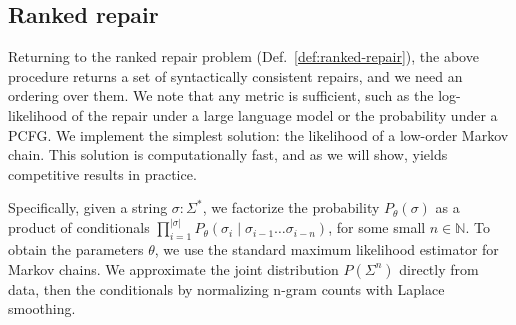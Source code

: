 \documentclass[sigplan,review,acmsmall,nonacm,anonymous]{acmart}\settopmatter{printfolios=false,printccs=false,printacmref=false}
\begin{document}


  \clearpage\subsection{Ranked repair}\label{sec:ranking}

  Returning to the ranked repair problem (Def.~\ref{def:ranked-repair}), the above procedure returns a set of syntactically consistent repairs, and we need an ordering over them. We note that any metric is sufficient, such as the log-likelihood of the repair under a large language model or the probability under a PCFG. We implement the simplest solution: the likelihood of a low-order Markov chain. This solution is computationally fast, and as we will show, yields competitive results in practice.

  Specifically, given a string $\sigma: \Sigma^*$, we factorize the probability $P_\theta(\sigma)$ as a product of conditionals $\prod_{i=1}^{|\sigma|}P_\theta(\sigma_i \mid \sigma_{i-1}\ldots\sigma_{i-n})$, for some small $n \in \mathbb{N}$. To obtain the parameters $\theta$, we use the standard maximum likelihood estimator for Markov chains. We approximate the joint distribution $P(\Sigma^n)$ directly from data, then the conditionals by normalizing n-gram counts with Laplace smoothing.
\end{document}
